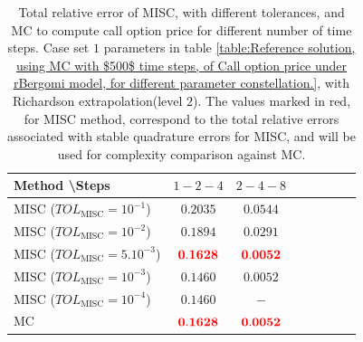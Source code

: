 \begin{table}[!h]
	\centering
	\begin{tabular}{l*{6}{c}r}
		Method \textbackslash  Steps            & $1-2-4$ & $2-4-8$  \\
		\hline
		MISC ($TOL_{\text{MISC}}=10^{-1}$)  & $\mathbf{0.2035
		}$ & $\mathbf{ 0.0544}$ \\
		MISC ($TOL_{\text{MISC}}=10^{-2}$)  & $\mathbf{0.1894}$ & $\mathbf{  0.0291}$   \\	
		MISC ($TOL_{\text{MISC}}=5.10^{-3}$)  & $\mathbf{{\color{red}0.1628}}$ & $\mathbf{{\color{red}0.0052}}$   \\
		MISC ($TOL_{\text{MISC}}=10^{-3}$)  & $\mathbf{0.1460}$ & $\mathbf{0.0052}$   \\
		MISC ($TOL_{\text{MISC}}=10^{-4}$)  & $\mathbf{0.1460}$ & $\mathbf{-}$  \\
		\hline
		MC   & $\mathbf{{\color{red}0.1628}}$  & $\mathbf{{\color{red}0.0052}}$    \\
		\hline
	\end{tabular}
	\caption{Total  relative error of MISC, with different tolerances, and MC to compute call option price for different number of time steps. Case set $1$ parameters in table \ref{table:Reference solution, using MC with $500$ time steps, of Call option price under rBergomi model, for different parameter constellation.}, with Richardson extrapolation(level $2$). The values marked in red, for MISC method, correspond to the total relative errors associated with  stable quadrature errors for MISC, and will be used for complexity comparison against MC.}
	\label{Total  error of MISC and MC to compute Call option price of the different tolerances for different number of time steps. Case set $1$ parameters, with Richardson extrapolation(level $2$). The numbers between parentheses are the corresponding absolute errors.}
\end{table}

\FloatBarrier

